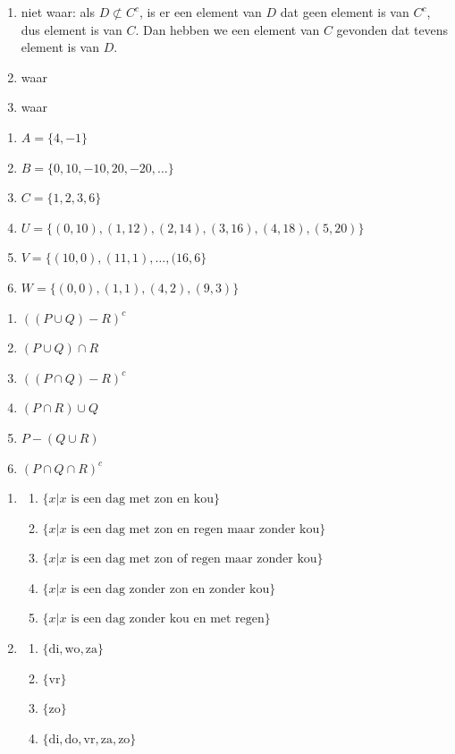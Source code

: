 \begin{Oplossing}{1.10}
\begin{enumerate}
\item niet waar: als $D \not \subset C^c$, is er  een element van $D$ dat geen element is van $C^c$, dus element is van $C$. Dan hebben we een element van $C$ gevonden dat tevens element is van $D$.
\item waar
\item waar
\end{enumerate}
\end{Oplossing}
\begin{Oplossing}{1.11}
\begin{enumerate}
\item $A=\{4,-1 \}$
\item $B=\{0,10,-10,20,-20,\dots \}$
\item $C=\{1,2,3,6 \}$
\item $U=\{(0,10),(1,12),(2,14),(3,16),(4,18),(5,20) \}$
\item  $V=\{(10,0),(11,1),\dots, (16,6\}$
\item $W=\{(0,0),(1,1),(4,2),(9,3) \}$
\end{enumerate}
\end{Oplossing}
\begin{Oplossing}{1.12}
\begin{enumerate}
\item $\left(\left(P\cup Q\right)-R\right)^c$
\item $\left(P\cup Q\right) \cap R$
\item $\left(\left(P\cap Q\right)-R\right)^c$
\item $(P\cap R)\cup Q$
\item $P-(Q\cup R)$
\item $(P\cap Q \cap R)^c$
\end{enumerate}
\end{Oplossing}
\begin{Oplossing}{1.13}
\begin{enumerate}
\item \begin{enumerate}
\item $\{x| x \text{ is een dag met zon en kou} \}$
\item $\{x| x \text{ is een dag met zon en regen maar zonder kou} \}$
\item $\{x| x \text{ is een dag met zon of regen maar zonder kou} \}$
\item $\{x| x \text{ is een dag zonder zon en zonder kou} \}$
\item $\{x| x \text{ is een dag zonder kou en met regen} \}$
\end{enumerate}
\item \begin{enumerate}
\item $\{\text{di},\text{wo},\text{za} \}$
\item $\{\text{vr} \}$
\item $\{ \text{zo}\}$
\item $\{ \text{di},\text{do},\text{vr},\text{za},\text{zo}\}$
\end{enumerate}
\end{enumerate}
\end{Oplossing}
